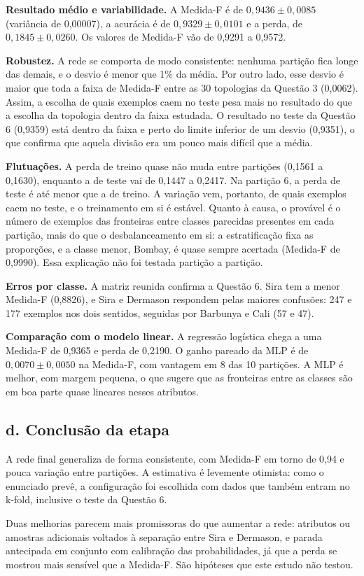 \textbf{Resultado médio e variabilidade.} A Medida-F é de $0{,}9436 \pm 0{,}0085$ (variância de 0,00007), a acurácia é de $0{,}9329 \pm 0{,}0101$ e a perda, de $0{,}1845 \pm 0{,}0260$. Os valores de Medida-F vão de 0,9291 a 0,9572.

\textbf{Robustez.} A rede se comporta de modo consistente: nenhuma partição fica longe das demais, e o desvio é menor que 1\% da média. Por outro lado, esse desvio é maior que toda a faixa de Medida-F entre as 30 topologias da Questão 3 (0,0062). Assim, a escolha de quais exemplos caem no teste pesa mais no resultado do que a escolha da topologia dentro da faixa estudada.
O resultado no teste da Questão 6 (0,9359) está dentro da faixa e perto do limite inferior de um desvio (0,9351), o que confirma que aquela divisão era um pouco mais difícil que a média.

\textbf{Flutuações.} A perda de treino quase não muda entre partições (0,1561 a 0,1630), enquanto a de teste vai de 0,1447 a 0,2417. Na partição 6, a perda de teste é até menor que a de treino. A variação vem, portanto, de quais exemplos caem no teste, e o treinamento em si é estável. Quanto à causa, o provável é o número de exemplos das fronteiras entre classes parecidas presentes em cada partição, mais do que
o desbalanceamento em si: a estratificação fixa as proporções, e a classe menor, Bombay, é quase sempre acertada (Medida-F de 0,9990). Essa explicação não foi testada partição a partição.

\textbf{Erros por classe.} A matriz reunida confirma a Questão 6. Sira tem a menor Medida-F (0,8826), e Sira e Dermason respondem pelas maiores confusões: 247 e 177 exemplos nos dois sentidos, seguidas por Barbunya e Cali (57 e 47).

\textbf{Comparação com o modelo linear.} A regressão logística chega a uma Medida-F de 0,9365 e perda de 0,2190. O ganho pareado da MLP é de $0{,}0070 \pm 0{,}0050$ na Medida-F, com vantagem em 8 das 10 partições. A MLP é melhor, com margem pequena, o que sugere que as fronteiras entre as classes são em boa parte quase lineares nesses atributos.

\subsection*{d. Conclusão da etapa}

A rede final generaliza de forma consistente, com Medida-F em torno de 0,94 e pouca variação entre partições. A estimativa é levemente otimista: como o enunciado prevê, a configuração foi escolhida com dados que também entram no k-fold, inclusive o teste da Questão 6.

Duas melhorias parecem mais promissoras do que aumentar a rede: atributos ou amostras adicionais voltados à separação entre Sira e Dermason, e parada antecipada em conjunto com calibração das probabilidades, já que a perda se mostrou mais sensível que a Medida-F. São hipóteses que este estudo não testou.

\FloatBarrier
